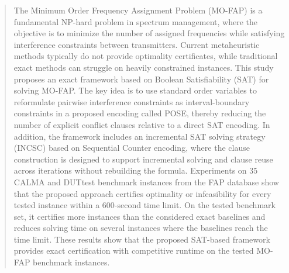 \documentclass[letterpaper,journal]{IEEEtran}
\begin{document}
\begin{abstract}
The Minimum Order Frequency Assignment Problem (MO-FAP) is a fundamental NP-hard problem in spectrum management, where the objective is to minimize the number of assigned frequencies while satisfying interference constraints between transmitters.
Current metaheuristic methods typically do not provide optimality certificates, while traditional exact methods can struggle on heavily constrained instances.
This study proposes an exact framework based on Boolean Satisfiability (SAT) for solving MO-FAP.
The key idea is to use standard order variables to reformulate pairwise interference constraints as interval-boundary constraints in a proposed encoding called POSE, thereby reducing the number of explicit conflict clauses relative to a direct SAT encoding.
In addition, the framework includes an incremental SAT solving strategy (INCSC) based on Sequential Counter encoding, where the clause construction is designed to support incremental solving and clause reuse across iterations without rebuilding the formula.
Experiments on 35 CALMA and DUTtest benchmark instances from the FAP database show that the proposed approach certifies optimality or infeasibility for every tested instance within a 600-second time limit.
On the tested benchmark set, it certifies more instances than the considered exact baselines and reduces solving time on several instances where the baselines reach the time limit.
These results show that the proposed SAT-based framework provides exact certification with competitive runtime on the tested MO-FAP benchmark instances.
\end{abstract}
\end{document}
